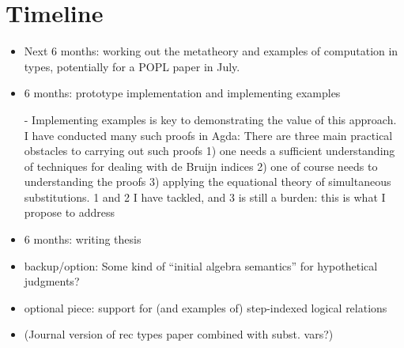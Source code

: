 \documentclass{article}
\begin{document}
\section{Timeline}
\begin{itemize}
\item Next 6 months: working out the metatheory and examples of computation in
types, potentially for a POPL paper in July.
\item 6 months: prototype implementation and implementing examples

 - Implementing examples is key to demonstrating the value of this
 approach. I have conducted many such proofs in Agda: There are three
 main practical obstacles to carrying out such proofs 1) one needs a
 sufficient understanding of techniques for dealing with de Bruijn
 indices 2) one of course needs to understanding the proofs 3)
 applying the equational theory of simultaneous substitutions. 1 and 2
 I have tackled, and 3 is still a burden: this is what I propose to address
\item 6 months: writing thesis
\item backup/option: Some kind of ``initial algebra semantics'' for hypothetical judgments?
\item optional piece: support for (and examples of) step-indexed
  logical relations
\item (Journal version of rec types paper combined with subst. vars?)
\end{itemize}



\end{document}
